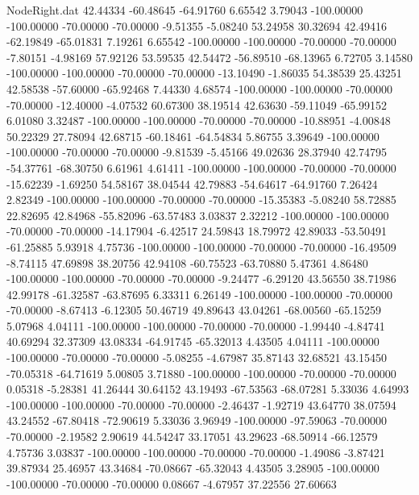 \begin{filecontents}{NodeRight.dat}
  42.44334  -60.48645  -64.91760     6.65542    3.79043 -100.00000 -100.00000  -70.00000  -70.00000   -9.51355   -5.08240   53.24958   30.32694
  42.49416  -62.19849  -65.01831     7.19261    6.65542 -100.00000 -100.00000  -70.00000  -70.00000   -7.80151   -4.98169   57.92126   53.59535
  42.54472  -56.89510  -68.13965     6.72705    3.14580 -100.00000 -100.00000  -70.00000  -70.00000  -13.10490   -1.86035   54.38539   25.43251
  42.58538  -57.60000  -65.92468     7.44330    4.68574 -100.00000 -100.00000  -70.00000  -70.00000  -12.40000   -4.07532   60.67300   38.19514
  42.63630  -59.11049  -65.99152     6.01080    3.32487 -100.00000 -100.00000  -70.00000  -70.00000  -10.88951   -4.00848   50.22329   27.78094
  42.68715  -60.18461  -64.54834     5.86755    3.39649 -100.00000 -100.00000  -70.00000  -70.00000   -9.81539   -5.45166   49.02636   28.37940
  42.74795  -54.37761  -68.30750     6.61961    4.61411 -100.00000 -100.00000  -70.00000  -70.00000  -15.62239   -1.69250   54.58167   38.04544
  42.79883  -54.64617  -64.91760     7.26424    2.82349 -100.00000 -100.00000  -70.00000  -70.00000  -15.35383   -5.08240   58.72885   22.82695
  42.84968  -55.82096  -63.57483     3.03837    2.32212 -100.00000 -100.00000  -70.00000  -70.00000  -14.17904   -6.42517   24.59843   18.79972
  42.89033  -53.50491  -61.25885     5.93918    4.75736 -100.00000 -100.00000  -70.00000  -70.00000  -16.49509   -8.74115   47.69898   38.20756
  42.94108  -60.75523  -63.70880     5.47361    4.86480 -100.00000 -100.00000  -70.00000  -70.00000   -9.24477   -6.29120   43.56550   38.71986
  42.99178  -61.32587  -63.87695     6.33311    6.26149 -100.00000 -100.00000  -70.00000  -70.00000   -8.67413   -6.12305   50.46719   49.89643
  43.04261  -68.00560  -65.15259     5.07968    4.04111 -100.00000 -100.00000  -70.00000  -70.00000   -1.99440   -4.84741   40.69294   32.37309
  43.08334  -64.91745  -65.32013     4.43505    4.04111 -100.00000 -100.00000  -70.00000  -70.00000   -5.08255   -4.67987   35.87143   32.68521
  43.15450  -70.05318  -64.71619     5.00805    3.71880 -100.00000 -100.00000  -70.00000  -70.00000    0.05318   -5.28381   41.26444   30.64152
  43.19493  -67.53563  -68.07281     5.33036    4.64993 -100.00000 -100.00000  -70.00000  -70.00000   -2.46437   -1.92719   43.64770   38.07594
  43.24552  -67.80418  -72.90619     5.33036    3.96949 -100.00000  -97.59063  -70.00000  -70.00000   -2.19582    2.90619   44.54247   33.17051
  43.29623  -68.50914  -66.12579     4.75736    3.03837 -100.00000 -100.00000  -70.00000  -70.00000   -1.49086   -3.87421   39.87934   25.46957
  43.34684  -70.08667  -65.32043     4.43505    3.28905 -100.00000 -100.00000  -70.00000  -70.00000    0.08667   -4.67957   37.22556   27.60663

\end{filecontents}

